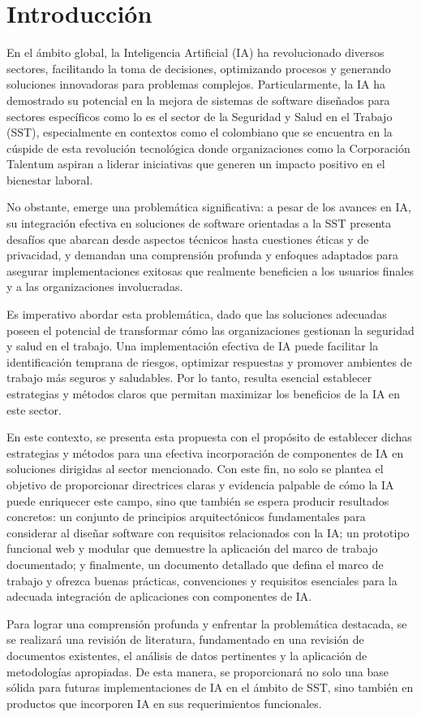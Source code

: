 \section{Introducción}

En el ámbito global, la Inteligencia Artificial (IA) ha revolucionado diversos sectores, facilitando la toma de decisiones, optimizando procesos y generando soluciones innovadoras para problemas complejos. Particularmente, la IA ha demostrado su potencial en la mejora de sistemas de software diseñados para sectores específicos como lo es el sector de la Seguridad y Salud en el Trabajo (SST), especialmente en contextos como el colombiano que se encuentra en la cúspide de esta revolución tecnológica donde organizaciones como la Corporación Talentum aspiran a liderar iniciativas que generen un impacto positivo en el bienestar laboral.

No obstante, emerge una problemática significativa: a pesar de los avances en IA, su integración efectiva en soluciones de software orientadas a la SST presenta desafíos que abarcan desde aspectos técnicos hasta cuestiones éticas y de privacidad, y demandan una comprensión profunda y enfoques adaptados para asegurar implementaciones exitosas que realmente beneficien a los usuarios finales y a las organizaciones involucradas.

Es imperativo abordar esta problemática, dado que las soluciones adecuadas poseen el potencial de transformar cómo las organizaciones gestionan la seguridad y salud en el trabajo. Una implementación efectiva de IA puede facilitar la identificación temprana de riesgos, optimizar respuestas y promover ambientes de trabajo más seguros y saludables. Por lo tanto, resulta esencial establecer estrategias y métodos claros que permitan maximizar los beneficios de la IA en este sector.

En este contexto, se presenta esta propuesta con el propósito de establecer dichas estrategias y métodos para una efectiva incorporación de componentes de IA en soluciones dirigidas al sector mencionado. Con este fin, no solo se plantea el objetivo de proporcionar directrices claras y evidencia palpable de cómo la IA puede enriquecer este campo, sino que también se espera producir resultados concretos: un conjunto de principios arquitectónicos fundamentales para considerar al diseñar software con requisitos relacionados con la IA; un prototipo funcional web y modular que demuestre la aplicación del marco de trabajo documentado; y finalmente, un documento detallado que defina el marco de trabajo y ofrezca buenas prácticas, convenciones y requisitos esenciales para la adecuada integración de aplicaciones con componentes de IA.

Para lograr una comprensión profunda y enfrentar la problemática destacada, se se realizará una revisión de literatura, fundamentado en una revisión de documentos existentes, el análisis de datos pertinentes y la aplicación de metodologías apropiadas. De esta manera, se proporcionará no solo una base sólida para futuras implementaciones de IA en el ámbito de SST, sino también en productos que incorporen IA en sus requerimientos funcionales.
